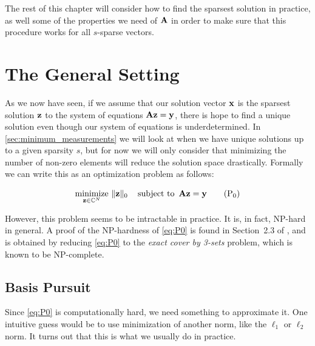 The rest of this chapter will consider how to find the sparsest solution in practice, as well some of the properties we need of $ \mathbf{A} $ in order to make sure that this procedure works for all $ s $-sparse vectors. 







\section{The General Setting}
As we now have seen, if we assume that our solution vector $ \mathbf{x} $ is the sparsest solution $ \mathbf{z} $ to the system of equations $ \mathbf{A}\mathbf{z} = \mathbf{y} $, there is hope to find a unique solution even though our system of equations is underdetermined. In \cref{sec:minimum_measurements} we will look at when we have unique solutions up to a given sparsity $ s $, but for now we will only consider that minimizing the number of non-zero elements will reduce the solution space drastically. Formally we can write this as an optimization problem as follows:

\begin{equation}
	\underset{\mathbf{z} \in \mathbb{C}^{N}}{\text{minimize}}~ \lVert\mathbf{z}\rVert_0
	\quad\operatorname*{subject~to}~ \mathbf{A}\mathbf{z} = \mathbf{y}
	\tag{P$_0$}
	\label{eq:P0}
\end{equation}

\noindent However, this problem seems to be intractable in practice. It is, in fact, NP-hard in general. A proof of the NP-hardness of \eqref{eq:P0} is found in Section~2.3 of \cite{foucart13intro}, and is obtained by reducing \eqref{eq:P0} to the \textit{exact cover by 3-sets} problem, which is known to be NP-complete.





\subsection{Basis Pursuit}
Since \eqref{eq:P0} is computationally hard, we need something to approximate it. One intuitive guess would be to use minimization of another norm, like the $ \ell_{1} $ or $ \ell_{2} $ norm. It turns out that this is what we usually do in practice. 

